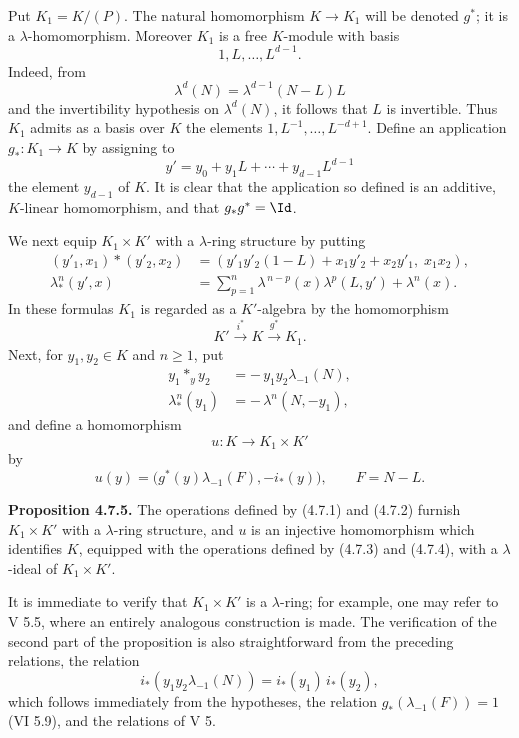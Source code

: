 \documentclass[11pt]{article}
\begin{document}
Put \(K_1=K/(P)\). The natural homomorphism \(K\to K_1\) will be denoted \(g^*\); it is a \(\lambda\)-homomorphism. Moreover \(K_1\) is a free \(K\)-module with basis
\[
  1,L,\ldots,L^{d-1}.
\]
Indeed, from
\[
  \lambda^d(N)=\lambda^{d-1}(N-L)L
\]
and the invertibility hypothesis on \(\lambda^d(N)\), it follows that \(L\) is invertible. Thus \(K_1\) admits as a basis over \(K\) the elements \(1,L^{-1},\ldots,L^{-d+1}\). Define an application \(g_*:K_1\to K\) by assigning to
\[
y'=y_0+y_1L+\cdots+y_{d-1}L^{d-1}
\]
the element \(y_{d-1}\) of \(K\). It is clear that the application so defined is an additive, \(K\)-linear homomorphism, and that \(g_*g^*=\Id\).

We next equip \(K_1\times K'\) with a \(\lambda\)-ring structure by putting
\begin{align}
 (y'_1,x_1)*(y'_2,x_2)
   &=(y'_1y'_2(1-L)+x_1y'_2+x_2y'_1,\; x_1x_2), \tag{4.7.1}\\
 \lambda^n_*(y',x)
   &=\sum_{p=1}^{n}\lambda^{\,n-p}(x)\lambda^p(L,y')
     +\lambda^n(x). \tag{4.7.2}
\end{align}
In these formulas \(K_1\) is regarded as a \(K'\)-algebra by the homomorphism
\[
  K'\xrightarrow{i^*}K\xrightarrow{g^*}K_1.
\]
Next, for \(y_1,y_2\in K\) and \(n\ge1\), put
\begin{align}
 y_1*_y y_2&=-\,y_1y_2\lambda_{-1}(N), \tag{4.7.3}\\
 \lambda^n_*(y_1)&=-\,\lambda^n(N,-y_1), \tag{4.7.4}
\end{align}
and define a homomorphism
\[
  u:K\longrightarrow K_1\times K'
\]
by
\[
  u(y)=\bigl(g^*(y)\lambda_{-1}(F),-i_*(y)\bigr),
  \qquad F=N-L.
\]

\textbf{Proposition 4.7.5.} The operations defined by (4.7.1) and (4.7.2) furnish \(K_1\times K'\) with a \(\lambda\)-ring structure, and \(u\) is an injective homomorphism which identifies \(K\), equipped with the operations defined by (4.7.3) and (4.7.4), with a \(\lambda\)-ideal of \(K_1\times K'\).

It is immediate to verify that \(K_1\times K'\) is a \(\lambda\)-ring; for example, one may refer to V 5.5, where an entirely analogous construction is made. The verification of the second part of the proposition is also straightforward from the preceding relations, the relation
\[
  i_*(y_1y_2\lambda_{-1}(N))=i_*(y_1)\,i_*(y_2),
\]
which follows immediately from the hypotheses, the relation \(g_*(\lambda_{-1}(F))=1\) (VI 5.9), and the relations of V 5.
\end{document}
